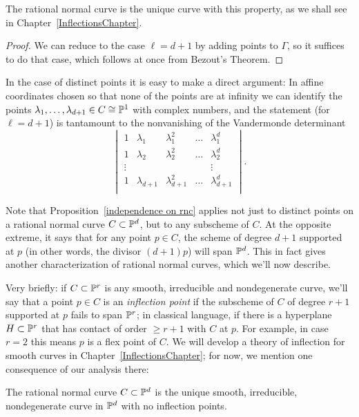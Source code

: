 The rational normal curve is the unique curve with this property, as we shall see in Chapter~\ref{InflectionsChapter}. 

\begin{proof}
We can reduce to the case $\ell = d+1$ by adding points to $\Gamma$, so it suffices to do that case, which follows at once from Bezout's Theorem.
\end{proof}

In the case of distinct points it is easy to make a direct argument: In affine coordinates chosen so that none of the points are
at infinity we can identify the points $\lambda_1,\dots,\lambda_{d+1} \in C \cong {\mathbb P}^1$ with complex numbers, and the statement (for $\ell = d+1$) is tantamount to the nonvanishing of the Vandermonde determinant
$$
\begin{vmatrix}
1 & \lambda_1 & \lambda_1^2 & \dots & \lambda_1^d \\
1 & \lambda_2 & \lambda_2^2 & \dots & \lambda_2^d \\
\vdots & & & & \vdots \\
1 & \lambda_{d+1} & \lambda_{d+1}^2 & \dots & \lambda_{d+1}^d \\
\end{vmatrix}.
$$

Note that Proposition~\ref{independence on rnc} applies not just to distinct points on a rational normal curve $C \subset {\mathbb P}^d$, but to any subscheme of $C$. At the opposite extreme, it says that for any point $p \in C$, the scheme of degree $d+1$ supported at $p$ (in other words, the divisor $(d+1)p$) will span ${\mathbb P}^d$. This in fact gives another characterization of rational normal curves, which we'll now describe.

Very briefly: if $C \subset {\mathbb P}^r$ is any smooth, irreducible and nondegenerate curve, we'll say that a point $p \in C$ is an \emph{inflection point} if the subscheme of $C$ of degree $r+1$ supported at $p$  fails to span ${\mathbb P}^r$; in classical language, if there is a hyperplane $H \subset {\mathbb P}^r$ that has contact of order $\geq r+1$ with $C$ at $p$. For example, in case $r=2$ this means $p$ is a flex point of $C$. We will develop a theory of inflection for smooth curves in Chapter~\ref{InflectionsChapter}; for now, we  mention one consequence of our analysis there:

\begin{proposition}
The rational normal curve $C \subset {\mathbb P}^d$ is the unique smooth, irreducible, nondegenerate curve in ${\mathbb P}^d$ with no inflection points.
\end{proposition}

